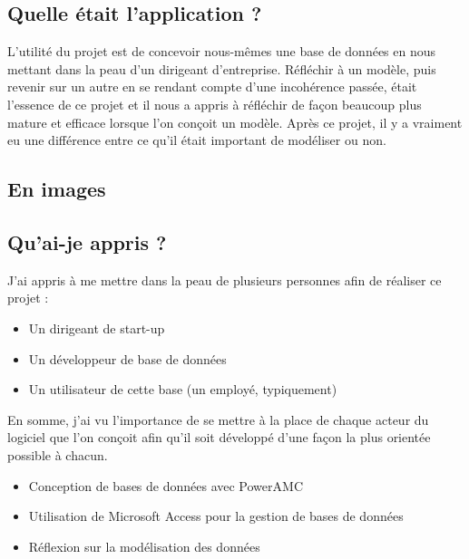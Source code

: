 \documentclass{mytex}
\begin{document}
\subsection{Quelle était l'application ?}

L'utilité du projet est de concevoir nous-mêmes une base de données en nous mettant dans la peau d'un dirigeant d'entreprise. Réfléchir à un modèle, puis revenir sur un autre en se rendant compte d'une incohérence passée, était l'essence de ce projet et il nous a appris à réfléchir de façon beaucoup plus mature et efficace lorsque l'on conçoit un modèle. Après ce projet, il y a vraiment eu une différence entre ce qu'il était important de modéliser ou non.

\subsection{En images}




\subsection{Qu'ai-je appris ?}

J'ai appris à me mettre dans la peau de plusieurs personnes afin de réaliser ce projet :

\begin{itemize}
	\item Un dirigeant de start-up
	\item Un développeur de base de données
	\item Un utilisateur de cette base (un employé, typiquement)
\end{itemize}

En somme, j'ai vu l'importance de se mettre à la place de chaque acteur du logiciel que l'on conçoit afin qu'il soit développé d'une façon la plus orientée possible à chacun.

\begin{itemize}
	\item Conception de bases de données avec PowerAMC
	\item Utilisation de Microsoft Access pour la gestion de bases de données
	\item Réflexion sur la modélisation des données
\end{itemize}
\end{document}
